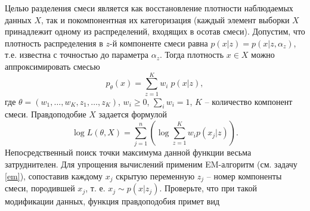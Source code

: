\begin{problem}






Целью разделения смеси является как восстановление плотности наблюдаемых данных $X$, так и покомпонентная их категоризация (каждый элемент выборки  $X$ принадлежит одному из распределений, входящих в осотав смеси).
Допустим, что плотность распределения в $z$-й компоненте смеси равна $p (x | z) = p (x | z, \alpha_z)$, т.е. известна с точностью до параметра $\alpha_z$. Тогда плотность $x \in X$ можно аппроксимировать смесью 
\[
p_{\theta}(x) = \sum \limits_{z = 1}^K w_i \; p (x | z),
\]
где $\theta = (w_1, \ldots, w_K, z_1, \ldots, z_K)$, $w_i \geq 0$, $\sum_i w_i = 1$, $K$ -- количество компонент смеси. Правдоподобие $X$ задается формулой 
\[
\log L(\theta, X) = \sum \limits_{j=1}^{n} \left(\log  \sum \limits_{z = 1}^K w_i p (x_j | z) \right). 
\]
Непосредственный поиск точки максимума данной функции весьма затруднителен. Для упрощения вычислений применим EM-алгоритм (см. задачу \ref{em}),  сопоставив каждому $x_j$  скрытую переменную $z_j$ -- номер компоненты смеси, породившей  $x_j$, т. е.  $x_j \sim p(x | z_j)$. 
Проверьте, что при такой модификации данных, функция правдоподобия примет вид


\end{problem}
